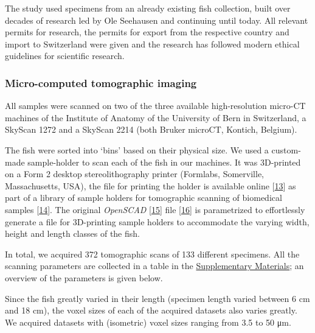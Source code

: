 The study used specimens from an already existing fish collection, built over decades of research led by Ole Seehausen and continuing until today.
All relevant permits for research, the permits for export from the respective country and import to Switzerland were given and the research has followed modern ethical guidelines for scientific research.

\hypertarget{micro-computed-tomographic-imaging}{%
\subsubsection{Micro-computed tomographic imaging}\label{micro-computed-tomographic-imaging}}

All samples were scanned on two of the three available high-resolution micro-CT machines of the Institute of Anatomy of the University of Bern in Switzerland, a SkyScan 1272 and a SkyScan 2214 (both Bruker microCT, Kontich, Belgium).

The fish were sorted into `bins' based on their physical size.
We used a custom-made sample-holder to scan each of the fish in our machines.
It was 3D-printed on a Form 2 desktop stereolithography printer (Formlabs, Somerville, Massachusetts, USA), the file for printing the holder is available online {[}\protect\hyperlink{ref-VCZPOv2f}{13}{]} as part of a library of sample holders for tomographic scanning of biomedical samples {[}\protect\hyperlink{ref-115PPSuQp}{14}{]}.
The original \emph{OpenSCAD} {[}\protect\hyperlink{ref-wsjdcTeC}{15}{]} file {[}\protect\hyperlink{ref-f7OzrzUv}{16}{]} is parametrized to effortlessly generate a file for 3D-printing sample holders to accommodate the varying width, height and length classes of the fish.

In total, we acquired 372 tomographic scans of 133 different specimens.
All the scanning parameters are collected in a table in the \protect\hyperlink{supplementary-materials}{Supplementary Materials}; an overview of the parameters is given below.

Since the fish greatly varied in their length (specimen length varied between 6 cm and 18 cm), the voxel sizes of each of the acquired datasets also varies greatly.
We acquired datasets with (isometric) voxel sizes ranging from 3.5 to 50 μm.


